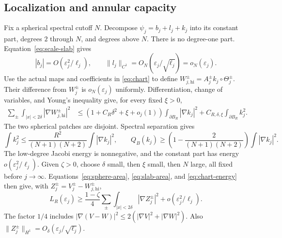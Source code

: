 \documentclass[11pt,reqno]{amsart}
\numberwithin{equation}{section}
\theoremstyle{definition}
\theoremstyle{remark}
\newcommand{\eps}{\varepsilon}
\begin{document}
\subsection{Localization and annular capacity}
Fix a spherical spectral cutoff $N$. Decompose
$\psi_j=b_j+l_j+k_j$ into its constant part, degrees $2$ through $N$,
and degrees above $N$. There is no degree-one part.
Equation~\eqref{eq:scale-slab} gives
\[
 |b_j|=O(\eps_j^2/\ell_j),\qquad
 \|l_j\|_{C^1}=O_N(\eps_j/\sqrt{\ell_j})=o_N(\eps_j).
\]
Use the actual maps and coefficients in \eqref{eq:chart} to define
$W_{j,\mathrm{hi}}^\pm=A_j^\pm k_j\circ\Theta_j^\pm$.
Their difference from $W_j^\pm$ is $o_N(\eps_j)$ uniformly.
Differentiation, change of variables, and Young's inequality give,
for every fixed $\xi>0$,
\begin{align}\label{eq:chart-energy}
 \sum_\pm\int_{|x|<2\delta}|\nabla W_{j,\mathrm{hi}}^\pm|^2
 &\le(1+C_R\delta^2+\xi+o_j(1))\int_{\partial B_R}|\nabla k_j|^2
 +C_{R,\delta,\xi}\int_{\partial B_R}k_j^2.
\end{align}
The two spherical patches are disjoint. Spectral separation gives
\[
 \int k_j^2\le\frac{R^2}{(N+1)(N+2)}\int|\nabla k_j|^2,\qquad
 Q_B(k_j)\ge\left(1-\frac2{(N+1)(N+2)}\right)\int|\nabla k_j|^2.
\]
The low-degree Jacobi energy is nonnegative, and the constant part has
energy $o(\eps_j^2/\ell_j)$. Given $\zeta>0$, choose $\delta$ small,
then $\xi$ small, then $N$ large, all fixed before $j\to\infty$.
Equations~\eqref{eq:sphere-area}, \eqref{eq:slab-area}, and
\eqref{eq:chart-energy} then give, with
$Z_j^\pm=V_j^\pm-W_{j,\mathrm{hi}}^\pm$,
\begin{equation}\label{eq:localized}
 L_R(\eps_j)\ge\frac{1-\zeta}{4}
 \sum_\pm\int_{|x|<2\delta}|\nabla Z_j^\pm|^2
 +o(\eps_j^2/\ell_j).
\end{equation}
The factor $1/4$ includes
$|\nabla(V-W)|^2\le2(|\nabla V|^2+|\nabla W|^2)$.
Also $\|Z_j^\pm\|_{H^1}=O_\delta(\eps_j/\sqrt{\ell_j})$.
\end{document}
